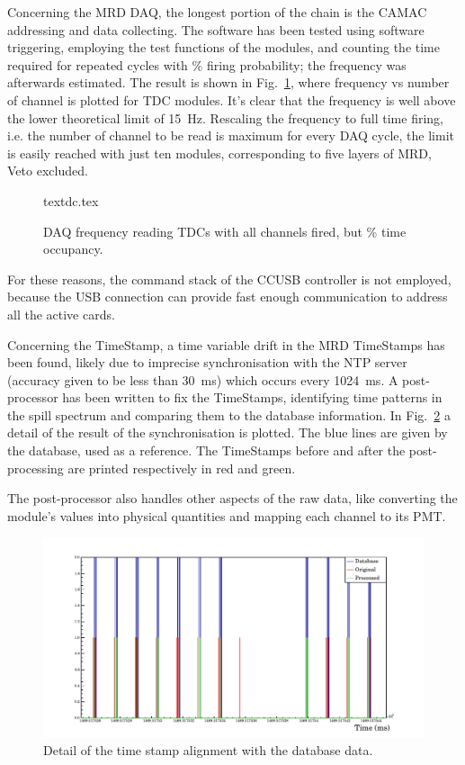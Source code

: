 Concerning the MRD DAQ, the longest portion of the chain is the CAMAC addressing and data collecting.
The software has been tested using software triggering, employing the test functions of the modules, %
and counting the time required for  repeated cycles with \% firing probability; %
the frequency was afterwards estimated.
The result is shown in Fig.~\ref{fig:tdcfreq}, where frequency vs number of channel is %
plotted for TDC modules.
It's clear that the frequency is well above the lower theoretical limit of 15~Hz.
Rescaling the frequency to full time firing, i.e. the number of channel to be read is maximum %
for every DAQ cycle, the limit is easily reached with just ten modules, corresponding %
to five layers of MRD, Veto excluded.

\begin{figure}
  \centering
  {textdc.tex}
    \caption{DAQ frequency reading TDCs with all channels fired, but \% time occupancy.}
  \label{fig:tdcfreq}
\end{figure}

For these reasons, the command stack of the CCUSB controller is not employed, %
because the USB connection can provide fast enough communication to address all the active cards.

Concerning the TimeStamp, a time variable drift in the MRD TimeStamps has been found, %
likely due to imprecise synchronisation with the NTP server %
(accuracy given to be less than 30~ms) which occurs every 1024~ms. 
A post-processor has been written to fix the TimeStamps, identifying time patterns in the %
spill spectrum and comparing them to the database information.
In Fig.~\ref{fig:tdcpost} a detail of the result of the synchronisation is plotted.
The blue lines are given by the database, used as a reference.
The TimeStamps before and after the post-processing are printed respectively in red and green.

The post-processor also handles other aspects of the raw data, like converting the module's values %
into physical quantities and mapping each channel to its PMT.

\begin{figure}
  \centering
  \includegraphics[scale=0.7]{pics/textime.pdf}
  \caption{Detail of the time stamp alignment with the database data.}
  \label{fig:tdcpost}
\end{figure}

